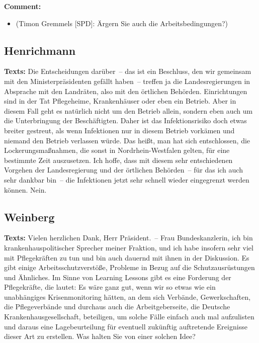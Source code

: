\documentclass{article}
\begin{document}
\noindent\textbf{Comment:}
\begin{itemize}
    \setlength\itemsep{-3pt}
    \item (Timon Gremmels [SPD]: Ärgern Sie auch die Arbeitsbedingungen?)
\end{itemize}
\subsection{Henrichmann}
\noindent\textbf{Texts:} Die Entscheidungen darüber – das ist ein Beschluss, den wir gemeinsam mit den Ministerpräsidenten gefällt haben – treffen ja die Landesregierungen in Absprache mit den Landräten, also mit den örtlichen Behörden. Einrichtungen sind in der Tat Pflegeheime, Krankenhäuser oder eben ein Betrieb. Aber in diesem Fall geht es natürlich nicht um den Betrieb allein, sondern eben auch um die Unterbringung der Beschäftigten. Daher ist das Infektionsrisiko doch etwas breiter gestreut, als wenn Infektionen nur in diesem Betrieb vorkämen und niemand den Betrieb verlassen würde. Das heißt, man hat sich entschlossen, die Lockerungsmaßnahmen, die sonst in Nordrhein-Westfalen gelten, für eine bestimmte Zeit auszusetzen. Ich hoffe, dass mit diesem sehr entschiedenen Vorgehen der Landesregierung und der örtlichen Behörden – für das ich auch sehr dankbar bin – die Infektionen jetzt sehr schnell wieder eingegrenzt werden können. Nein.

\subsection{Weinberg}
\noindent\textbf{Texts:} Vielen herzlichen Dank, Herr Präsident. – Frau Bundeskanzlerin, ich bin krankenhauspolitischer Sprecher meiner Fraktion, und ich habe insofern sehr viel mit Pflegekräften zu tun und bin auch dauernd mit ihnen in der Diskussion. Es gibt einige Arbeitsschutzverstöße, Probleme in Bezug auf die Schutzausrüstungen und Ähnliches. Im Sinne von Learning Lessons gibt es eine Forderung der Pflegekräfte, die lautet: Es wäre ganz gut, wenn wir so etwas wie ein unabhängiges Krisenmonitoring hätten, an dem sich Verbände, Gewerkschaften, die Pflegeverbände und durchaus auch die Arbeitgeberseite, die Deutsche Krankenhausgesellschaft, beteiligen, um solche Fälle einfach auch mal aufzulisten und daraus eine Lagebeurteilung für eventuell zukünftig auftretende Ereignisse dieser Art zu erstellen. Was halten Sie von einer solchen Idee?
\end{document}
